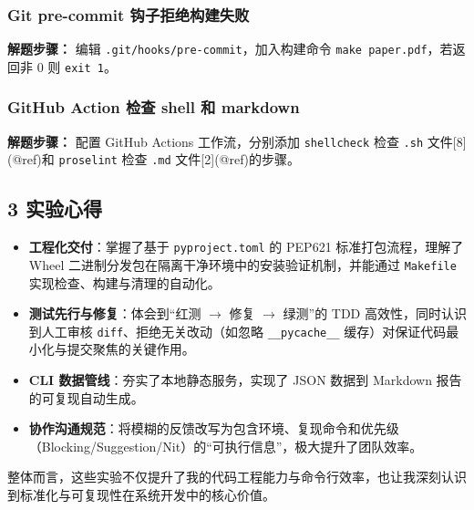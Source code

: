 \documentclass[12pt, a4paper]{ctexart}
\begin{document}
\subsubsection{Git pre-commit 钩子拒绝构建失败}
\textbf{解题步骤：}
编辑 \texttt{.git/hooks/pre-commit}，加入构建命令 \texttt{make paper.pdf}，若返回非 0 则 \texttt{exit 1}。

\subsubsection{GitHub Action 检查 shell 和 markdown}
\textbf{解题步骤：}
配置 GitHub Actions 工作流，分别添加 \texttt{shellcheck} 检查 \texttt{.sh} 文件[8](@ref)和 \texttt{proselint} 检查 \texttt{.md} 文件[2](@ref)的步骤。
\subsection*{3 实验心得}

\begin{itemize}
    \item \textbf{工程化交付}：掌握了基于 \texttt{pyproject.toml} 的 PEP621 标准打包流程，理解了 Wheel 二进制分发包在隔离干净环境中的安装验证机制，并能通过 \texttt{Makefile} 实现检查、构建与清理的自动化。
    \item \textbf{测试先行与修复}：体会到“红测 $\rightarrow$ 修复 $\rightarrow$ 绿测”的 TDD 高效性，同时认识到人工审核 \texttt{diff}、拒绝无关改动（如忽略 \texttt{\_\_pycache\_\_} 缓存）对保证代码最小化与提交聚焦的关键作用。
    \item \textbf{CLI 数据管线}：夯实了本地静态服务，实现了 JSON 数据到 Markdown 报告的可复现自动生成。
    \item \textbf{协作沟通规范}：将模糊的反馈改写为包含环境、复现命令和优先级（Blocking/Suggestion/Nit）的“可执行信息”，极大提升了团队效率。
\end{itemize}

整体而言，这些实验不仅提升了我的代码工程能力与命令行效率，也让我深刻认识到标准化与可复现性在系统开发中的核心价值。
\end{document}
